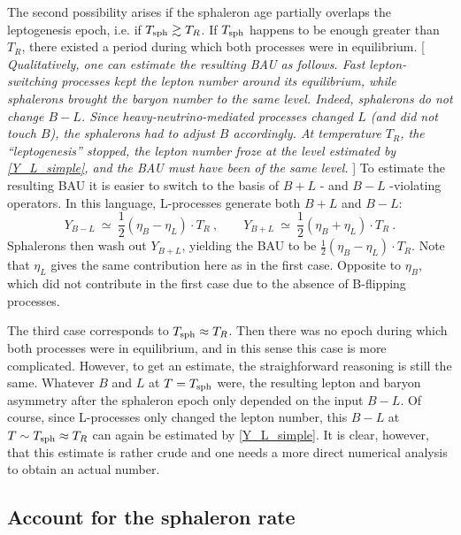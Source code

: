 \documentclass[12pt]{revtex4}
\newcommand{\Tsph}{T_{\rm sph}}
\begin{document}
	The second possibility arises if the sphaleron age partially
	overlaps the leptogenesis epoch, i.e. if $ \Tsph \gtrsim T_R $.
	If $ \Tsph $ happens to be enough greater than $ T_R $, there
	existed a period during which both processes were in equilibrium.
	[{\it
	Qualitatively, one can estimate the resulting BAU as follows.
	Fast lepton-switching processes kept the lepton number around
	its equilibrium, while sphalerons brought the baryon number to
	the same level.
	Indeed, sphalerons do not change $ B - L $. 
	Since heavy-neutrino-mediated processes changed $ L $ 
	(and did not touch $ B $), the sphalerons had to adjust $ B $ 
	accordingly. 
	At temperature $ T_R $, the ``leptogenesis'' stopped, 
	the lepton number froze at the level estimated by \eqref{Y_L_simple},
	and the BAU must have been of the same level. 
	}]
	To estimate the resulting BAU it is easier to switch to the
	basis of $ B + L $ - and $ B - L $ -violating operators.
	In this language, L-processes generate both  $ B + L $ and $ B - L $:
\[
	Y_{B-L} ~\simeq~ \frac 12 (\eta_B - \eta_L ) \cdot T_R~,\qquad
	Y_{B+L} ~\simeq~ \frac 12 (\eta_B + \eta_L ) \cdot T_R~.
\]	
	Sphalerons then wash out $ Y_{B+L} $, yielding the BAU to be
	$ \frac 12 (\eta_B - \eta_L ) \cdot T_R $.
	Note that $ \eta_L $ gives the same contribution here as in the 
	first case.
	Opposite to $ \eta_B $, which did not contribute in the first case
	due to the absence of B-flipping processes.
	
	The third case corresponds to $ \Tsph \approx T_R $.
	Then there was no epoch during which both processes
	were in equilibrium, and in this sense this case is more complicated.
	However, to get an estimate, the straighforward reasoning is
	still the same.
	Whatever $ B $ and $ L $ at $ T = \Tsph $ were, the resulting
	lepton and baryon asymmetry after the sphaleron epoch only
	depended on the input $ B - L $.
	Of course, since L-processes only changed the lepton number,
	this $ B - L $ at  $ T \sim \Tsph \approx T_R $ can 
	again be estimated by \eqref{Y_L_simple}.
	It is clear, however, that this estimate is rather crude and 
	one needs a more direct numerical analysis to obtain an actual
	number.
	

\subsection{Account for the sphaleron rate}
\end{document}
